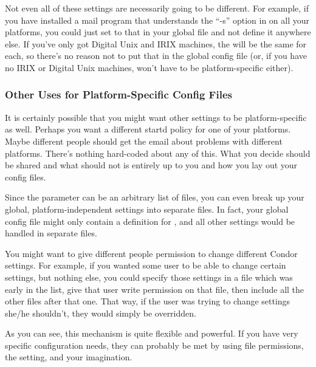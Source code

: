 Not even all of these settings are necessarily going to be different.
For example, if you have installed a mail program that understands the
``-s'' option in  on all your platforms, you
could just set  to that in your global file and not define
it anywhere else.  If you've only got Digital Unix and IRIX machines,
the  will be the same for each, so there's no
reason not to put that in the global config file (or, if you have no
IRIX or Digital Unix machines,  won't have to be
platform-specific either).

\subsubsection{Other Uses for Platform-Specific Config Files}
\label{sec:Other-Uses-for-Platform-Files}

It is certainly possible that you might want other settings to be
platform-specific as well.  Perhaps you want a different startd policy
for one of your platforms.  Maybe different people should get the
email about problems with different platforms.  There's nothing
hard-coded about any of this.  What you decide should be shared and
what should not is entirely up to you and how you lay out your config
files.

Since the  parameter can be an arbitrary
list of files, you can even break up your global, platform-independent
settings into separate files.  In fact, your global config file might
only contain a definition for , and all
other settings would be handled in separate files.  

You might want to give different people permission to change different
Condor settings.  For example, if you wanted some user to be able to
change certain settings, but nothing else, you could specify those
settings in a file which was early in the 
list, give that user write permission on that file, then include all
the other files after that one.  That way, if the user was trying to
change settings she/he shouldn't, they would simply be overridden.  

As you can see, this mechanism is quite flexible and powerful.  If you
have very specific configuration needs, they can probably be met by
using file permissions, the  setting, and
your imagination.

